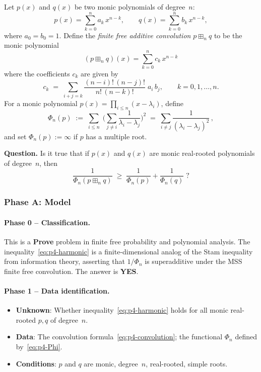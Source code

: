 
Let $p(x)$ and $q(x)$ be two monic polynomials of degree~$n$:
\[
  p(x) = \sum_{k=0}^{n} a_k\, x^{n-k}, \qquad
  q(x) = \sum_{k=0}^{n} b_k\, x^{n-k},
\]
where $a_0 = b_0 = 1$. Define the \emph{finite free additive convolution}
$p \boxplus_n q$ to be the monic polynomial
\[
  (p \boxplus_n q)(x) = \sum_{k=0}^{n} c_k\, x^{n-k}
\]
where the coefficients $c_k$ are given by
\begin{equation}\label{eq:p4-convolution}
  c_k \;=\; \sum_{i+j=k}
  \frac{(n-i)!\,(n-j)!}{n!\,(n-k)!}\; a_i\, b_j,
  \qquad k = 0, 1, \ldots, n.
\end{equation}
For a monic polynomial $p(x) = \prod_{i \leq n}(x - \lambda_i)$, define
\begin{equation}\label{eq:p4-Phi}
  \Phi_n(p) \;:=\;
  \sum_{i \leq n}\; \Biggl(\sum_{j \neq i}
  \frac{1}{\lambda_i - \lambda_j}\Biggr)^{\!2}
  \;=\;
  \sum_{i \neq j}
  \frac{1}{(\lambda_i - \lambda_j)^2}\,,
\end{equation}
and set $\Phi_n(p) := \infty$ if $p$ has a multiple root.

\textbf{Question.} Is it true that if $p(x)$ and $q(x)$ are monic
real-rooted polynomials of degree~$n$, then
\begin{equation}\label{eq:p4-harmonic}
  \frac{1}{\Phi_n(p \boxplus_n q)}
  \;\geq\;
  \frac{1}{\Phi_n(p)} + \frac{1}{\Phi_n(q)}\;?
\end{equation}


\subsubsection*{Phase A: Model}

\paragraph{Phase 0 -- Classification.}
This is a \textbf{Prove} problem in finite free probability and polynomial
analysis. The inequality~\eqref{eq:p4-harmonic} is a finite-dimensional
analog of the Stam inequality from information theory, asserting that
$1/\Phi_n$ is superadditive under the MSS finite free convolution.
The answer is \textbf{YES}.

\paragraph{Phase 1 -- Data identification.}
\begin{itemize}
\item \textbf{Unknown}: Whether inequality~\eqref{eq:p4-harmonic} holds
  for all monic real-rooted $p, q$ of degree~$n$.
\item \textbf{Data}: The convolution formula~\eqref{eq:p4-convolution};
  the functional $\Phi_n$ defined by~\eqref{eq:p4-Phi}.
\item \textbf{Conditions}: $p$ and $q$ are monic, degree~$n$, real-rooted,
  simple roots.
\end{itemize}


